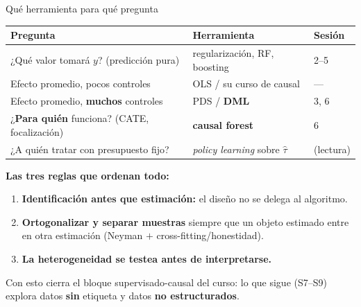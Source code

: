 \documentclass{beamer}
\newcommand{\1}{\mathbb{I}}
\begin{document}
\begin{frame}{Qué herramienta para qué pregunta}
\small
\begin{center}
\footnotesize
\setlength{\tabcolsep}{4pt}
\begin{tabular}{lll}
\hline
Pregunta & Herramienta & Sesión \\
\hline
¿Qué valor tomará $y$? (predicción pura) & regularización, RF, boosting & 2--5 \\
Efecto promedio, pocos controles & OLS / su curso de causal & --- \\
Efecto promedio, \textbf{muchos} controles & PDS / \textbf{DML} & 3, 6 \\
¿\textbf{Para quién} funciona? (CATE, focalización) & \textbf{causal forest} & 6 \\
¿A quién tratar con presupuesto fijo? & \emph{policy learning} sobre $\hat{\tau}$ & (lectura) \\
\hline
\end{tabular}
\end{center}
\pause

\vspace{0.25cm}
\textbf{Las tres reglas que ordenan todo:}
\begin{enumerate}\itemsep4pt
  \item \textbf{Identificación antes que estimación:} el diseño no se delega al algoritmo.
  \item \textbf{Ortogonalizar y separar muestras} siempre que un objeto estimado entre en otra estimación (Neyman $+$ cross-fitting/honestidad).
  \item \textbf{La heterogeneidad se testea antes de interpretarse.}
\end{enumerate}
\pause

\vspace{0.1cm}
Con esto cierra el bloque supervisado-causal del curso: lo que sigue (S7--S9) explora datos \textbf{sin} etiqueta y datos \textbf{no estructurados}.
\end{frame}
\end{document}
